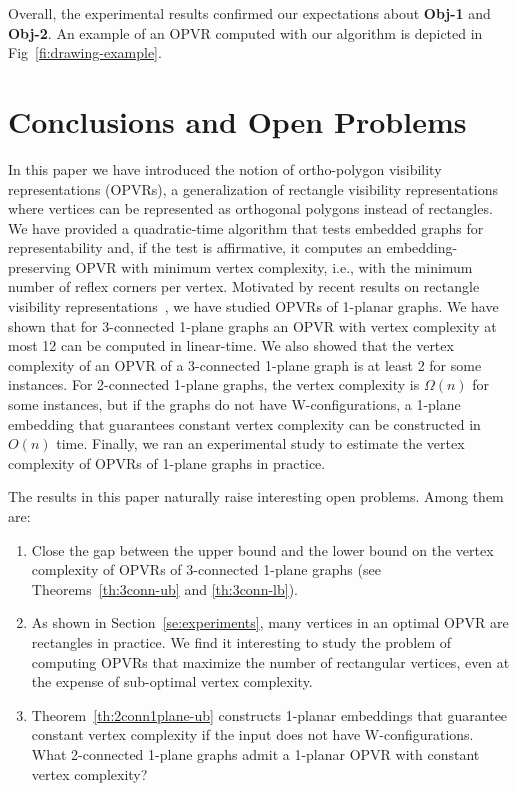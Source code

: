 \documentclass{article}
\newcommand{\opvr}{OPVR\xspace}
\begin{document}
Overall, the experimental results confirmed our expectations about {\bf Obj-1} and {\bf Obj-2}. 
An example of an \opvr computed with our algorithm is depicted in Fig~\ref{fi:drawing-example}.   



\section{Conclusions and Open Problems}\label{se:conclusions}

In this paper we have introduced the notion of ortho-polygon visibility representations (\opvr{s}), a generalization of rectangle visibility representations where vertices can be represented as orthogonal polygons instead of rectangles. We have provided a quadratic-time algorithm that tests embedded graphs for representability and, if the test is affirmative, it computes an embedding-preserving \opvr with minimum vertex complexity, i.e., with the minimum number of reflex corners per vertex. Motivated by recent results on rectangle visibility representations~\cite{SoCG}, we have studied \opvr{s} of 1-planar graphs. We have shown that for 3-connected 1-plane graphs an \opvr with vertex complexity at most 12 can be computed in linear-time. We also showed that the vertex complexity of an \opvr of a 3-connected 1-plane graph is at least 2 for some instances. For 2-connected 1-plane graphs, the vertex complexity is $\Omega(n)$ for some instances, but if the graphs do not have W-configurations, a 1-plane embedding that guarantees constant vertex complexity can be constructed in $O(n)$ time. Finally, we ran an experimental study to estimate the vertex complexity of \opvr{s} of 1-plane graphs in practice.

The results in this paper naturally raise interesting open problems. Among them are: 

\begin{enumerate}
\item Close the gap between the upper bound and the lower bound on the vertex complexity of {\opvr}s of 3-connected 1-plane graphs (see Theorems~\ref{th:3conn-ub} and \ref{th:3conn-lb}). 
\item As shown in Section~\ref{se:experiments}, many vertices in an optimal \opvr are rectangles in practice. We find it interesting to study the problem of computing {\opvr}s that maximize the number of rectangular vertices, even at the expense of sub-optimal vertex complexity. 
\item Theorem~\ref{th:2conn1plane-ub} constructs 1-planar embeddings that guarantee constant vertex complexity if the input does not have W-configurations. What 2-connected 1-plane graphs admit a 1-planar {\opvr} with constant vertex complexity? 
\end{enumerate} 
\end{document}

